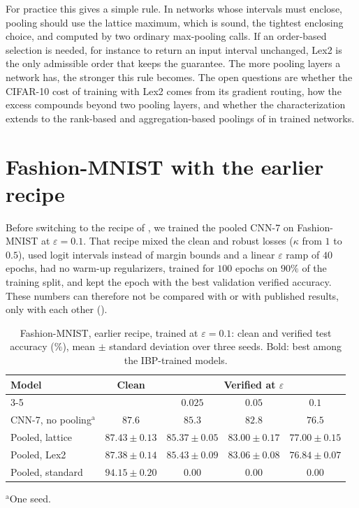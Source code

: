 \documentclass[preprint,12pt]{elsarticle}
\theoremstyle{definition}
\newcommand{\eps}{\varepsilon}
\begin{document}
For practice this gives a simple rule. In networks whose intervals must enclose, pooling should use the lattice maximum, which is sound, the tightest enclosing choice, and computed by two ordinary max-pooling calls. If an order-based selection is needed, for instance to return an input interval unchanged, Lex2 is the only admissible order that keeps the guarantee. The more pooling layers a network has, the stronger this rule becomes. The open questions are whether the CIFAR-10 cost of training with Lex2 comes from its gradient routing, how the excess compounds beyond two pooling layers, and whether the characterization extends to the rank-based and aggregation-based poolings of  in trained networks.

\appendix
\setcounter{table}{0}
\setcounter{figure}{0}

\section{Fashion-MNIST with the earlier recipe}
\label{sec:fmnist}

Before switching to the recipe of , we trained the pooled CNN-7 on Fashion-MNIST \cite{xiao2017fmnist} at $\eps=0.1$. That recipe mixed the clean and robust losses ($\kappa$ from $1$ to $0.5$), used logit intervals instead of margin bounds and a linear $\eps$ ramp of $40$ epochs, had no warm-up regularizers, trained for $100$ epochs on $90\%$ of the training split, and kept the epoch with the best validation verified accuracy. These numbers can therefore not be compared with  or with published results, only with each other ().

\begin{table}[ht]
\centering\small
\setlength{\tabcolsep}{4pt}
\caption{Fashion-MNIST, earlier recipe, trained at $\eps=0.1$: clean and verified test accuracy (\%), mean $\pm$ standard deviation over three seeds. Bold: best among the IBP-trained models.}
\label{tab:fmnist}
\begin{tabular}{lcccc}
\toprule
Model & Clean & \multicolumn{3}{c}{Verified at $\eps$} \\
\cmidrule(lr){3-5}
 & & $0.025$ & $0.05$ & $0.1$ \\
\midrule
CNN-7, no pooling$^{\mathrm{a}}$ & $\mathbf{87.6}$ & $85.3$ & $82.8$ & $76.5$ \\
Pooled, lattice  & $87.43\pm0.13$ & $85.37\pm0.05$ & $83.00\pm0.17$ & $\mathbf{77.00\pm0.15}$ \\
Pooled, Lex2     & $87.38\pm0.14$ & $\mathbf{85.43\pm0.09}$ & $\mathbf{83.06\pm0.08}$ & $76.84\pm0.07$ \\
Pooled, standard & $94.15\pm0.20$ & $0.00$ & $0.00$ & $0.00$ \\
\bottomrule
\end{tabular}
\par\smallskip
\parbox{\linewidth}{\footnotesize $^{\mathrm{a}}$One seed.}
\end{table}
\end{document}
